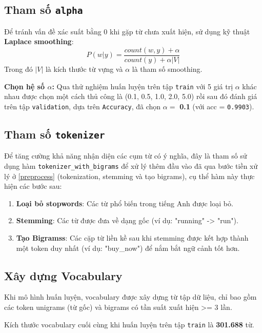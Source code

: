 \subsection{Tham số \texttt{alpha}}
Để tránh vấn đề xác suất bằng 0 khi gặp từ chưa xuất hiện, sử dụng kỹ thuật \textbf{Laplace smoothing}:
$$P(w|y) = \frac{count(w, y) + \alpha}{count(y) + \alpha|V|}$$
Trong đó $|V|$ là kích thước từ vựng và $\alpha$ là tham số smoothing.

\textbf{}

\textbf{Chọn hệ số $\alpha$:} Qua thử nghiệm huấn luyện trên tập \texttt{train} với 5 giá trị $\alpha$ khác nhau được chọn một cách thủ công là (0.1, 0.5, 1.0, 2.0, 5.0) rồi sau đó đánh giá trên tập \texttt{validation}, dựa trên \texttt{Accuracy}, đã chọn $\alpha = $ \textbf{0.1} (với acc = \texttt{0.9903}).

\subsection{Tham số \texttt{tokenizer}}
Để tăng cường khả năng nhận diện các cụm từ có ý nghĩa, đây là tham số sử dụng hàm \texttt{tokenizer\_with\_bigrams} để xử lý thêm đầu vào đã qua bước tiền xử lý ở \ref{preprocess} (tokenization, stemming và tạo bigrams), cụ thể hàm này thực hiện các bước sau: 
\begin{enumerate}
    \item \textbf{Loại bỏ stopwords}: Các từ phổ biến trong tiếng Anh được loại bỏ.
    \item \textbf{Stemming}: Các từ được đưa về dạng gốc (ví dụ: "running" -> "run").
    \item \textbf{Tạo Bigramss}: Các cặp từ liền kề sau khi stemming được kết hợp thành một token duy nhất (ví dụ: "buy\_now") để nắm bắt ngữ cảnh tốt hơn.
\end{enumerate}

\subsection{Xây dựng Vocabulary}
Khi mô hình huấn luyện, vocabulary được xây dựng từ tập dữ liệu, chỉ bao gồm các token  unigrams (từ gốc) và bigrams có tần suất xuất hiện >= 3 lần. 

Kích thước vocabulary cuối cùng khi huấn luyện trên tập \texttt{train} là \textbf{301.688} từ.

